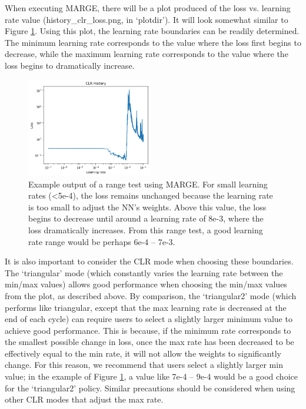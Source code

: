 \documentclass[letterpaper, 12pt]{article}
\begin{document}
\noindent When executing MARGE, there will be a plot produced of the loss vs. 
learning rate value (history\_clr\_loss.png, in `plotdir').  It will look somewhat similar 
to Figure \ref{fig:rangetest}.  Using this plot, the learning rate boundaries can be 
readily determined.  The minimum learning rate corresponds to the value where 
the loss first begins to decrease, while the maximum learning rate corresponds 
to the value where the loss begins to dramatically increase.\newline

\begin{figure}[h]
\centering
\includegraphics[width=0.49\textwidth, clip]{range_test.png}
\caption{Example output of a range test using MARGE.  For small learning rates 
(\textless 5e-4), the loss remains unchanged because the learning rate is too 
small to adjust the NN's weights.  Above this value, the loss begins to decrease
until around a learning rate of 8e-3, where the loss dramatically increases. 
From this range test, a good learning rate range would be perhaps 6e-4 -- 
7e-3.}  
\label{fig:rangetest}
\end{figure}

\noindent It is also important to consider the CLR mode when choosing these 
boundaries.  The `triangular' mode (which constantly varies the 
learning rate between the min/max values) allows good performance when choosing 
the min/max values from the plot, as described above.  By comparison, the 
`triangular2' mode (which performs like triangular, except that the max 
learning rate is decreased at the end of each cycle) can require users to 
select a slightly larger minimum value to achieve good performance.  This is 
because, if the minimum rate corresponds to the smallest possible change in 
loss, once the max rate has been decreased to be effectively equal to the min 
rate, it will not allow the weights to significantly change.  For this reason, 
we recommend that users select a slightly larger min value; in the example of 
Figure \ref{fig:rangetest}, a value like 7e-4 -- 9e-4 would be a good choice 
for the `triangular2' policy.  Similar precautions should be considered when 
using other CLR modes that adjust the max rate.
\end{document}
